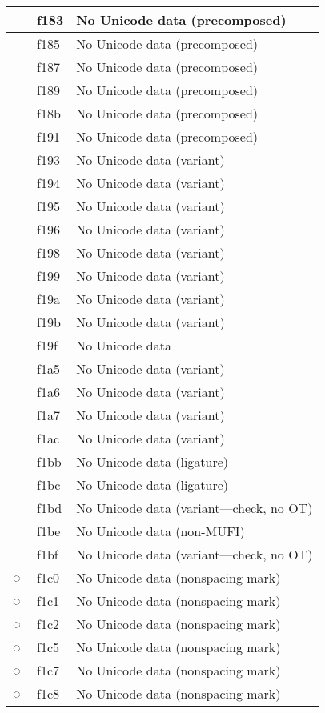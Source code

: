 \documentclass[12pt,letterpaper,openany]{book}
\begin{document}
\begin{center}
\begin{supertabular}{|m{0.25in}|m{0.5in}|m{4in}|}
 & f183 & No Unicode data (precomposed)\\\hline
 & f185 & No Unicode data (precomposed)\\\hline
 & f187 & No Unicode data (precomposed)\\\hline
 & f189 & No Unicode data (precomposed)\\\hline
 & f18b & No Unicode data (precomposed)\\\hline
 & f191 & No Unicode data (precomposed)\\\hline
 & f193 & No Unicode data (variant)\\\hline
 & f194 & No Unicode data (variant)\\\hline
 & f195 & No Unicode data (variant)\\\hline
 & f196 & No Unicode data (variant)\\\hline
 & f198 & No Unicode data (variant)\\\hline
 & f199 & No Unicode data (variant)\\\hline
 & f19a & No Unicode data (variant)\\\hline
 & f19b & No Unicode data (variant)\\\hline
 & f19f & No Unicode data\\\hline
 & f1a5 & No Unicode data (variant)\\\hline
 & f1a6 & No Unicode data (variant)\\\hline
 & f1a7 & No Unicode data (variant)\\\hline
 & f1ac & No Unicode data (variant)\\\hline
 & f1bb & No Unicode data (ligature)\\\hline
 & f1bc & No Unicode data (ligature)\\\hline
 & f1bd & No Unicode data (variant---check, no OT)\\\hline
 & f1be & No Unicode data (non-MUFI)\\\hline
 & f1bf & No Unicode data (variant---check, no OT)\\\hline
◌ & f1c0 & No Unicode data (nonspacing mark)\\\hline
◌ & f1c1 & No Unicode data (nonspacing mark)\\\hline
◌ & f1c2 & No Unicode data (nonspacing mark)\\\hline
◌ & f1c5 & No Unicode data (nonspacing mark)\\\hline
◌ & f1c7 & No Unicode data (nonspacing mark)\\\hline
◌ & f1c8 & No Unicode data (nonspacing mark)\\\hline

\end{supertabular}
\end{center}
\end{document}
